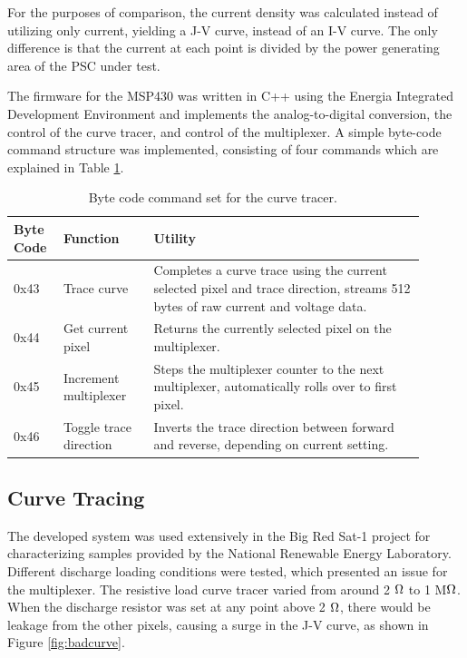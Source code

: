 \documentclass[12pt]{iopart}
\begin{document}
For the purposes of comparison, the current density was calculated instead of utilizing only current, yielding a J-V curve, instead of an I-V curve.  The only difference is that the current at each point is divided by the power generating area of the PSC under test.  

The firmware for the MSP430 was written in C++ using the Energia Integrated Development Environment and implements the analog-to-digital conversion, the control of the curve tracer, and control of the multiplexer.  A simple byte-code command structure was implemented, consisting of four commands which are explained in Table \ref{tab:my-table}.  

\begin{table}[!htb]
	\centering
	\caption{Byte code command set for the curve tracer.}
	\label{tab:my-table}
	\begin{tabular}{p{0.1\linewidth} | p{0.2\linewidth} | p{0.6\linewidth}}
		\hline
		Byte Code & Function & Utility \\ 
		\hline
		0x43 & Trace curve & Completes a curve trace using the current selected pixel and trace   direction, streams 512 bytes of raw current and voltage data. \\
		0x44 & Get current pixel & Returns the currently selected pixel on the multiplexer.   \\
		0x45 & Increment multiplexer & Steps the multiplexer counter to the next multiplexer, automatically   rolls over to first pixel.  \\
		0x46 & Toggle trace direction & Inverts the trace direction between forward and reverse, depending on   current setting. \\
		\hline
	\end{tabular}
\end{table}


\subsection*{Curve Tracing}

The developed system was used extensively in the Big Red Sat-1 project for characterizing samples provided by the National Renewable Energy Laboratory.  Different discharge loading conditions were tested, which presented an issue for the multiplexer.  The resistive load curve tracer varied from around 2 ${\ohm}$ to 1 M${\ohm}$.  When the discharge resistor was set at any point above 2 ${\ohm}$, there would be leakage from the other pixels, causing a surge in the J-V curve, as shown in Figure \ref{fig:badcurve}.
\end{document}

